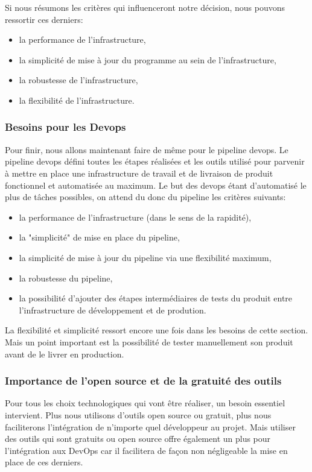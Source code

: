 \documentclass[
    iai, %
    il, %
]{heig-tb}
\begin{document}
Si nous résumons les critères qui influenceront notre décision, nous pouvons ressortir ces derniers:
\begin{itemize}
    \item la performance de l'infrastructure,
    \item la simplicité de mise à jour du programme au sein de l'infrastructure,
    \item la robustesse de l'infrastructure,
    \item la flexibilité de l'infrastructure.
\end{itemize}

\subsubsection{Besoins pour les Devops}
Pour finir, nous allons maintenant faire de même pour le pipeline \Gls{devops}.
Le pipeline \Gls{devops} défini toutes les étapes réalisées et les outils utilisé pour parvenir à mettre en place une infrastructure de travail et de livraison de produit fonctionnel et automatisée au maximum.\newline
Le but des \Gls{devops} étant d'automatisé le plus de tâches possibles, on attend du donc du pipeline les critères suivants:
\begin{itemize}
    \item la performance de l'infrastructure (dans le sens de la rapidité),
    \item la "simplicité" de mise en place du pipeline,
    \item la simplicité de mise à jour du pipeline via une flexibilité maximum,
    \item la robustesse du pipeline,
    \item la possibilité d'ajouter des étapes intermédiaires de tests du produit entre l'infrastructure de développement et de prodution.
\end{itemize}

La flexibilité et simplicité ressort encore une fois dans les besoins de cette section.
Mais un point important est la possibilité de tester manuellement son produit avant de le livrer en production.

\subsubsection{Importance de l'open source et de la gratuité des outils}
Pour tous les choix technologiques qui vont être réaliser, un besoin essentiel intervient.
Plus nous utilisons d'outils open source ou gratuit, plus nous faciliterons l'intégration de n'importe quel développeur au projet.\newline
Mais utiliser des outils qui sont gratuits ou open source offre également un plus pour l'intégration aux DevOps car il facilitera de façon non négligeable la mise en place de ces derniers.
\end{document}
